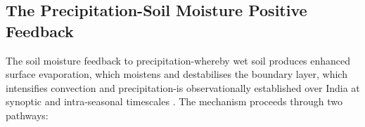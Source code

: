%

\subsection{The Precipitation-Soil Moisture Positive Feedback}
\label{subsec:precip_sm_feedback}

The soil moisture feedback to precipitation-whereby wet soil produces
enhanced surface evaporation, which moistens and destabilises the
boundary layer, which intensifies convection and precipitation-is
observationally established over India at synoptic and intra-seasonal
timescales \citep{longterm2025, wei2016impact}.
The mechanism proceeds through two pathways:

